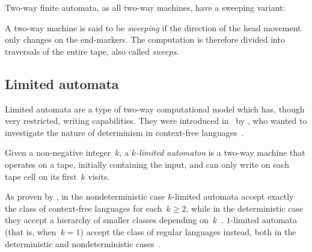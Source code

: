 Two-way finite automata, as all two-way machines, have a sweeping variant:
\begin{defn}\label{def:sweeping}
	A two-way machine is said to be \emph{sweeping} if the direction of the head movement only changes on the end-markers.
	The computation is therefore divided into traversals of the entire tape, also called \emph{sweeps}.
\end{defn}


\subsection{Limited automata}
Limited automata are a type of two-way computational model which has, though very restricted, writing capabilities.
They were introduced in~\citeyear{Hib67} by \citeauthor{Hib67}, who wanted to investigate the nature of determinism in context-free languages~\cite{Hib67}.

Given a non-negative integer~$k$, a \emph{$k$-limited automaton} is a two-way machine that operates on a tape, initially containing the input, and can only write on each tape cell on its first~$k$ visits.

As proven by \citeauthor{Hib67}, in the nondeterministic case $k$-limited automata accept exactly the class of context-free languages for each~$k\ge2$, while in the deterministic case they accept a hierarchy of smaller classes depending on~$k$~\cite{Hib67}.
$1$-limited automata (that is, when~$k=1$) accept the class of regular languages instead, both in the deterministic and nondeterministic cases~\cite{WagWec86}.

